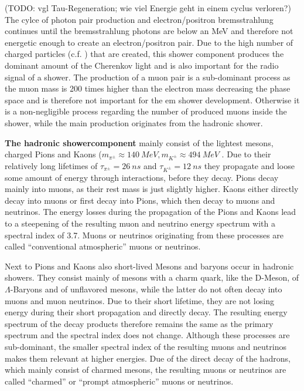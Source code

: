 (TODO: vgl Tau-Regeneration; wie viel Energie geht in einem cyclus verloren?)
The cylce of photon pair production and electron/positron bremsstrahlung continues until the bremsstrahlung photons are below an MeV and therefore not energetic enough to create an electron/positron pair.
Due to the high number of charged particles (c.f. ) that are created, this shower component produces the dominant amount of the Cherenkov light and is also important for the radio signal of a shower.
The production of a muon pair is a sub-dominant process as the muon mass is 200 times higher than the electron mass decreasing the phase space and is therefore not important for the em shower development.
Otherwise it is a non-negligible process regarding the number of produced muons inside the shower, while the main production originates from the hadronic shower.

\textbf{The hadronic showercomponent} mainly consist of the lightest mesons, charged Pions and Kaons ($m_{\pi^{\pm}} \approx \SI{140}{MeV}, m_{K^{\pm}} \approx \SI{494}{MeV}$ \cite{PDG20}.
Due to their relatively long lifetimes of $\tau_{\pi^{\pm}} = \SI{26}{ns}$ and $\tau_{K^{\pm}} = \SI{12}{ns}$ they propagate and loose some amount of energy through interactions, before they decay.
Pions decay mainly into muons, as their rest mass is just slightly higher.
Kaons either directly decay into muons or first decay into Pions, which then decay to muons and neutrinos.
The energy losses during the propagation of the Pions and Kaons lead to a steepening of the resulting muon and neutrino energy spectrum with a spectral index of \num{3.7}.
Muons or neutrinos originating from these processes are called \enquote{conventional atmospheric} muons or neutrinos.

Next to Pions and Kaons also short-lived Mesons and baryons occur in hadronic showers.
They consist mainly of mesons with a charm quark, like the D-Meson, of $\Lambda$-Baryons and of unflavored mesons, while the latter do not often decay into muons and muon neutrinos.
Due to their short lifetime, they are not losing energy during their short propagation and directly decay.
The resulting energy spectrum of the decay products therefore remains the same as the primary spectrum and the spectral index does not change.
Although these processes are sub-dominant, the smaller spectral index of the resulting muons and neutrinos makes them relevant at higher energies.
Due of the direct decay of the hadrons, which mainly consist of charmed mesons, the resulting muons or neutrinos are called \enquote{charmed} or \enquote{prompt atmospheric} muons or neutrinos.

